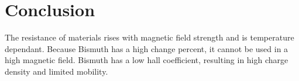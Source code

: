 \section{Conclusion}
	The resistance of materials rises with magnetic field strength and is temperature dependant. Because Bismuth has a high change percent, it cannot be used in a high magnetic field. Bismuth has a low hall coefficient, resulting in high charge density and limited mobility.
